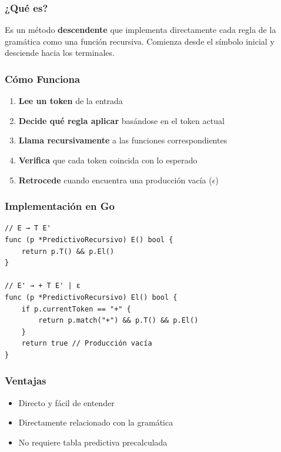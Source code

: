 \documentclass[12pt]{article}
\begin{document}
\subsubsection{¿Qué es?}

Es un método \textbf{descendente} que implementa directamente cada regla de la gramática como una función recursiva. Comienza desde el símbolo inicial y desciende hacia los terminales.

\subsubsection{Cómo Funciona}

\begin{enumerate}
    \item \textbf{Lee un token} de la entrada
    \item \textbf{Decide qué regla aplicar} basándose en el token actual
    \item \textbf{Llama recursivamente} a las funciones correspondientes
    \item \textbf{Verifica} que cada token coincida con lo esperado
    \item \textbf{Retrocede} cuando encuentra una producción vacía ($\epsilon$)
\end{enumerate}

\subsubsection{Implementación en Go}

\begin{lstlisting}
// E → T E'
func (p *PredictivoRecursivo) E() bool {
    return p.T() && p.El()
}

// E' → + T E' | ε
func (p *PredictivoRecursivo) El() bool {
    if p.currentToken == "+" {
        return p.match("+") && p.T() && p.El()
    }
    return true // Producción vacía
}
\end{lstlisting}

\subsubsection{Ventajas}

\begin{itemize}
    \item Directo y fácil de entender
    \item Directamente relacionado con la gramática
    \item No requiere tabla predictiva precalculada
\end{itemize}
\end{document}
